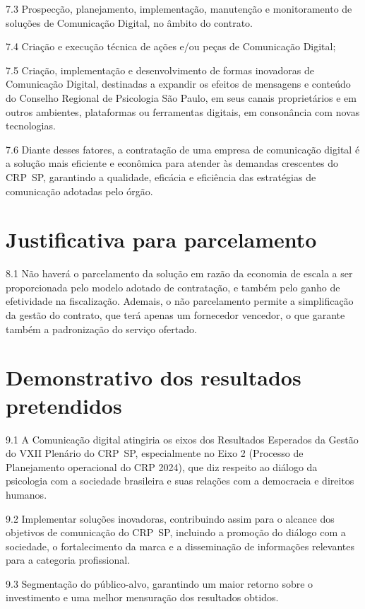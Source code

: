 \documentclass[oneside,a4paper,article]{memoir}
\begin{document}
7.3 Prospecção, planejamento, implementação, manutenção e monitoramento
de soluções de Comunicação Digital, no âmbito do contrato.

7.4 Criação e execução técnica de ações e/ou peças de Comunicação
Digital;

7.5 Criação, implementação e desenvolvimento de formas inovadoras de
Comunicação Digital, destinadas a expandir os efeitos de mensagens e
conteúdo do Conselho Regional de Psicologia São Paulo, em seus canais
proprietários e em outros ambientes, plataformas ou ferramentas
digitais, em consonância com novas tecnologias.

7.6 Diante desses fatores, a contratação de uma empresa de comunicação
digital é a solução mais eficiente e econômica para atender às demandas
crescentes do CRP~SP, garantindo a qualidade, eficácia e eficiência das
estratégias de comunicação adotadas pelo órgão.

\chapter{Justificativa para parcelamento}

8.1 Não haverá o parcelamento da solução em razão da economia de escala
a ser proporcionada pelo modelo adotado de contratação, e também pelo
ganho de efetividade na fiscalização. Ademais, o não parcelamento
permite a simplificação da gestão do contrato, que terá apenas um
fornecedor vencedor, o que garante também a padronização do serviço
ofertado.

\chapter{Demonstrativo dos resultados pretendidos}

9.1 A Comunicação digital atingiria os eixos dos Resultados Esperados da
Gestão do VXII Plenário do CRP~SP, especialmente no Eixo 2 (Processo de
Planejamento operacional do CRP 2024), que diz respeito ao diálogo da
psicologia com a sociedade brasileira e suas relações com a democracia e
direitos humanos.

9.2 Implementar soluções inovadoras, contribuindo assim para o alcance
dos objetivos de comunicação do CRP~SP, incluindo a promoção do diálogo
com a sociedade, o fortalecimento da marca e a disseminação de
informações relevantes para a categoria profissional.

9.3 Segmentação do público-alvo, garantindo um maior retorno sobre o
investimento e uma melhor mensuração dos resultados obtidos.
\end{document}
